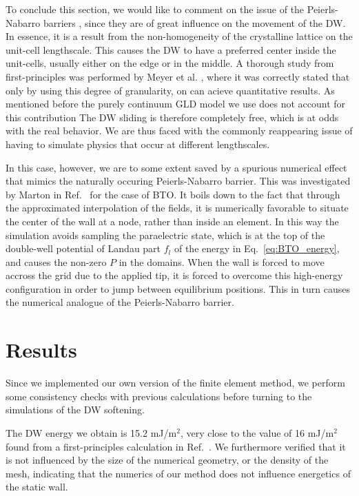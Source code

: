To conclude this section, we would like to comment on the issue of the Peierls-Nabarro barriers \cite{Peierls1940,Nabarro1947}, since they are of great influence on the movement of the DW.
In essence, it is a result from the non-homogeneity of the crystalline lattice on the unit-cell lengthscale.
This causes the DW to have a preferred center inside the unit-cells, usually either on the edge or in the middle.
A thorough study from first-principles was performed by Meyer et al. \cite{Meyer2002}, where it was correctly stated that only by using this degree of granularity, on can acieve quantitative results.
As mentioned before the purely continuum GLD model we use does not account for this contribution
The DW sliding is therefore completely free, which is at odds with the real behavior.
We are thus faced with the commonly reappearing issue of having to simulate physics that occur at different lengthscales.

In this case, however, we are to some extent saved by a spurious numerical effect that mimics the naturally occuring Peierls-Nabarro barrier.
This was investigated by Marton in Ref.~\cite{Marton2018} for the case of BTO.
It boils down to the fact that through the approximated interpolation of the fields, it is numerically favorable to situate the center of the wall at a node, rather than inside an element.
In this way the simulation avoids sampling the paraelectric state, which is at the top of the double-well potential of Landau part $f_l$ of the energy in Eq.~\ref{eq:BTO_energy}, and causes the non-zero $P$ in the domains.
When the wall is forced to move accross the grid due to the applied tip, it is forced to overcome this high-energy configuration in order to jump between equilibrium positions.
This in turn causes the numerical analogue of the Peierls-Nabarro barrier.

\section{Results}
Since we implemented our own version of the finite element method, we perform some consistency checks with previous calculations before turning to the simulations of the DW softening.

The DW energy we obtain is 15.2 mJ/m$^2$, very close to the value of 16 mJ/m$^2$ found from a first-principles calculation in Ref.~\cite{Padilla1996}.
We furthermore verified that it is not influenced by the size of the numerical geometry, or the density of the mesh, indicating that the numerics of our method does not influence energetics of the static wall.

